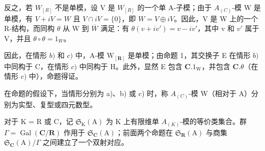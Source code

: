 反之，若 \(W_{[R]}\) 不是单模，设 V 是 \(W_{[R]}\) 的一个单 A-子模；由于 \(A_{(C)}\)-模 W 是单模，有 \(V + iV = W\) 且 \(V \cap iV = \{0\}\)，即 \(W = V \oplus iV\)。因此，V 是 W 上的一个 R-结构，而同构 \(\theta\) 从 W 到 \(\overline{W}\) 满足：有 \(\theta(v + iv') = v - iv'\)，其中 v 和 \(v'\) 属于 V，并且 \(\theta \circ \theta = 1_{W}\)。

因此，在情形 \(b)\) 和 \(c)\) 中，A-模 \(\mathrm{W}_{[\mathbf{R}]}\) 是单模；由命题 1，其交换子 E 在情形 \(b)\) 中同构于 C，在情形 \(c)\) 中同构于 H。此外，显然 E 包含 \(\mathbf{C}.1_{\mathrm{W}}\)，并包含 \(\mathbf{C}.\theta\)（在情形 \(c)\) 中），命题得证。

在命题的假设下，当情形分别为 a)、b) 或 c) 时，称 \(A_{(C)}\)-模 W（相对于 A）分别为实型、复型或四元数型。

对于 K = R 或 C，记 \(\mathfrak{S}_{\mathrm{K}}(\mathrm{A})\) 为 K 上有限维单 \(A_{(K)}\)-模的等价类集合。群 \(\Gamma = \operatorname{Gal}(\mathbf{C}/\mathbf{R})\) 作用于 \(\mathfrak{S}_{\mathbf{C}}(\mathrm{A})\)；前面两个命题在 \(\mathfrak{S}_{\mathbf{R}}(\mathrm{A})\) 与商集 \(\mathfrak{S}_{\mathbf{C}}(\mathrm{A})/\Gamma\) 之间建立了一个双射对应。
\relax{}
